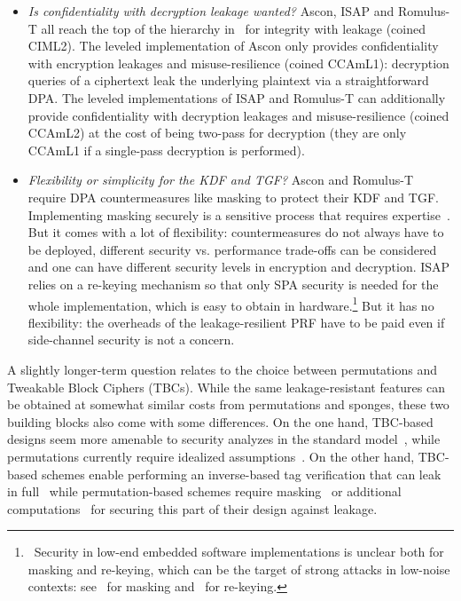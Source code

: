 \documentclass{llncs}
\begin{document}
\begin{itemize}
\item \emph{Is confidentiality with decryption leakage wanted?} 
Ascon, ISAP and Romulus-T all reach the top of the hierarchy
in~\cite{DBLP:conf/latincrypt/GuoPPS19} for integrity with leakage (coined CIML2). The leveled
implementation of Ascon only provides confidentiality with encryption leakages and misuse-resilience
(coined CCAmL1): decryption queries of a ciphertext leak the underlying plaintext via a straightforward DPA.
The leveled implementations of ISAP and Romulus-T can additionally provide
confidentiality with decryption leakages and misuse-resilience (coined CCAmL2) at the cost
of being two-pass for decryption (they are only CCAmL1 if a single-pass
decryption is performed).

\item \emph{Flexibility or simplicity for the KDF and TGF?} Ascon and Romulus-T require
DPA countermeasures like masking to protect their KDF and TGF. Implementing masking
securely is a sensitive process that requires expertise~\cite{DBLP:conf/ctrsa/MangardPG05,DBLP:conf/cosade/CoronGPRRV12}. But it comes with a lot of flexibility: 
countermeasures do not always have to be deployed, different security vs. performance
trade-offs can be considered and one can have different security levels in encryption
and decryption. ISAP relies on a re-keying mechanism so that only SPA security is needed
for the whole implementation, which is easy to obtain in hardware.\footnote{~Security in low-end embedded software implementations
is unclear both for masking and re-keying, which can be the target of strong attacks
in low-noise contexts: see~\cite{DBLP:journals/tches/BronchainS21} for masking and~\cite{DBLP:journals/tches/KannwischerPP20,DBLP:conf/crypto/BelliziaBCGGMPP20} for re-keying. }
But it has no flexibility: the overheads of the leakage-resilient PRF have to be paid even if side-channel
security is not a concern. 
\end{itemize}
A slightly longer-term question relates to the choice between 
permutations and Tweakable Block Ciphers (TBCs). While the same leakage-resistant
features can be obtained at somewhat similar costs from  permutations and sponges, these
two building blocks also come with some differences. On the one hand,
TBC-based designs seem more amenable to security analyzes in the standard model~\cite{DBLP:journals/tches/BertiGPPS20,DBLP:conf/asiacrypt/BertiGPS21}, while
permutations currently require idealized 
assumptions~\cite{DBLP:conf/asiacrypt/DobraunigM19,DBLP:journals/tosc/GuoPPS20}.
On the other hand, TBC-based schemes enable performing an inverse-based tag verification
that can leak in full~\cite{DBLP:journals/tosc/BertiPPS17} while permutation-based schemes
require masking~\cite{DBLP:journals/tches/BronchainMPS21} or additional
computations~\cite{DBLP:conf/eurocrypt/DobraunigM21} for securing this part of their design
against leakage.
\end{document}

